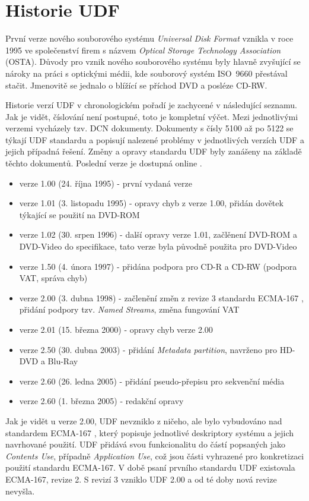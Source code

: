 \section{Historie UDF}
\label{sec:historie-udf}
První verze nového souborového systému \textit{Universal Disk Format} vznikla v roce 1995 ve společenství firem s názvem \textit{Optical Storage Technology Association} (OSTA). Důvody pro vznik nového souborového systému byly hlavně zvyšující se nároky na práci s optickými médii, kde souborový systém ISO~9660 přestával stačit. Jmenovitě se jednalo o blížící se příchod DVD a posléze CD-RW.

Historie verzí UDF v chronologickém pořadí je zachycené v následující seznamu. Jak je vidět, číslování není postupné, toto je kompletní výčet. Mezi jednotlivými verzemi vycházely tzv. DCN dokumenty. Dokumenty s čísly 5100 až po 5122 se týkají UDF standardu a popisují nalezené problémy v jednotlivých verzích UDF a jejich případná řešení. Změny a opravy standardu UDF byly zanášeny na základě těchto dokumentů. Poslední verze je dostupná online \cite{dcn}.
\begin{itemize}
    \item verze 1.00 (24. října 1995) - první vydaná verze
    \item verze 1.01 (3. listopadu 1995) - opravy chyb z verze 1.00, přidán dovětek týkající se použití na DVD-ROM
    \item verze 1.02 (30. srpen 1996) - další opravy verze 1.01, začlěnení DVD-ROM a DVD-Video do specifikace, tato verze byla původně použita pro DVD-Video
    \item verze 1.50 (4. února 1997) - přidána podpora pro CD-R a CD-RW (podpora VAT, správa chyb)
    \item verze 2.00 (3. dubna 1998) - začlenění změn z revize 3 standardu ECMA-167 \cite{ecma-167}, přidání podpory tzv. \textit{Named Streams}, změna fungování VAT
    \item verze 2.01 (15. března 2000) - opravy chyb verze 2.00
    \item verze 2.50 (30. dubna 2003) - přidání \textit{Metadata partition}, navrženo pro HD-DVD a Blu-Ray
    \item verze 2.60 (26. ledna 2005) - přidání pseudo-přepisu pro sekvenční média
    \item verze 2.60 (1. března 2005) - redakční opravy
\end{itemize}
Jak je vidět u verze 2.00, UDF nevzniklo z ničeho, ale bylo vybudováno nad standardem ECMA-167 \cite{ecma-167}, který popisuje jednotlivé deskriptory systému a jejich navrhované použití. UDF přidává svou funkcionalitu do částí popsaných jako \textit{Contents Use}, případně \textit{Application Use}, což jsou části vyhrazené pro konkretizaci použití standardu ECMA-167. V době psaní prvního standardu UDF existovala ECMA-167, revize 2. S revizí 3 vzniklo UDF 2.00 a od té doby nová revize nevyšla. 

